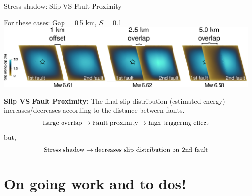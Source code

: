 \documentclass{beamer}
\begin{document}
\begin{frame}
 {Stress shadow: Slip VS Fault Proximity}

\begin{center}
\vskip -0.2cm    \centering For these cases: Gap = 0.5 km, $S$ = 0.1 
\vskip 0.2cm \includegraphics[width=1\linewidth]{images/stress_shadow.png}
\end{center}
\vskip -0.2cm
{\bf Slip VS Fault Proximity:}
\vskip 0cm
The final slip distribution (estimated energy) increases/decreases according to the distance between faults. 
\vskip -0.6cm \pause
\begin{equation*}
 \textnormal{Large overlap} \rightarrow \textnormal{Fault proximity} \rightarrow \textnormal{high triggering effect} 
\end{equation*}
\vskip -0.6cm
but, \pause
\vskip -0.8cm
\begin{equation*}
 \textnormal{Stress shadow} \rightarrow \textnormal{decreases slip distribution on 2nd fault}
\end{equation*}
 
\end{frame}


\section{On going work and to dos!}
\end{document}
